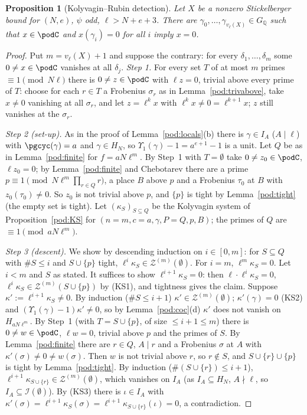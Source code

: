 \documentclass[10pt]{amsart}
\newtheorem{proposition}[theorem]{Proposition}
\theoremstyle{definition}
\theoremstyle{remark}
\newcommand{\Q}{\mathbb Q}
\begin{document}
\begin{proposition}[Kolyvagin--Rubin detection]\label{pod:koly}
Let $X$ be a nonzero Stickelberger bound for $(N,e)$, $\psi$ odd, $\ell>N+e+3$. There are
$\gamma_0,\dots,\gamma_{v_\ell(X)}\in G_\Q$ such that $x\in\podC$ and $x(\gamma_i)=0$ for all $i$ imply
$x=0$.
\end{proposition}
\begin{proof}
Put $m=v_\ell(X)+1$ and suppose the contrary: for every $\delta_1,\dots,\delta_m$ some $0\ne x\in\podC$
vanishes at all $\delta_j$. \emph{Step 1.} For every set $T$ of at most $m$ primes $\equiv1\pmod
{N\ell}$ there is $0\ne z\in\podC$ with $\ell z=0$, trivial above every prime of $T$: choose for each
$r\in T$ a Frobenius $\sigma_r$ as in Lemma~\ref{pod:trivabove}, take $x\ne0$ vanishing at all
$\sigma_r$, and let $z=\ell^kx$ with $\ell^kx\ne0=\ell^{k+1}x$; $z$ still vanishes at the $\sigma_r$.

\emph{Step 2 (set-up).} As in the proof of Lemma~\ref{pod:locals}(b) there is $\gamma\in I_A$
($A\mid\ell$) with $\pgcyc(\gamma)=a$ and $\gamma\in H_N$, so
$\Upsilon_1(\gamma)-1=a^{e+1}-1$ is a unit. Let $Q$ be as in Lemma~\ref{pod:finite} for
$f=aN\ell^m$. By Step~1 with $T=\emptyset$ take $0\ne z_0\in\podC$, $\ell z_0=0$; by
Lemma~\ref{pod:finite} and Chebotarev there are a prime $p\equiv1\pmod{N\ell^m\prod_{r\in Q}r}$, a place
$B$ above $p$ and a Frobenius $\tau_0$ at $B$ with $z_0(\tau_0)\ne0$. So $z_0$ is not trivial above
$p$, and $\{p\}$ is tight by Lemma~\ref{pod:tight} (the empty set is tight). Let $(\kappa_S)_{S
\subseteq Q}$ be the Kolyvagin system of Proposition~\ref{pod:KS} for $(n=m,c=a,\gamma,P=Q,p,B)$; the
primes of $Q$ are $\equiv1\pmod{aN\ell^m}$.

\emph{Step 3 (descent).} We show by descending induction on $i\in[0,m]$: for $S\subseteq Q$ with
$\#S\le i$ and $S\cup\{p\}$ tight, $\ell^i\kappa_S\in\mathcal Z^{(m)}(\emptyset)$. For $i=m$,
$\ell^m\kappa_S=0$. Let $i<m$ and $S$ as stated. It suffices to show $\ell^{i+1}\kappa_S=0$: then
$\ell\cdot\ell^i\kappa_S=0$, $\ell^i\kappa_S\in\mathcal Z^{(m)}(S\cup\{p\})$ by (KS1), and tightness
gives the claim. Suppose $\kappa':=\ell^{i+1}\kappa_S\ne0$. By induction ($\#S\le i+1$) $\kappa'\in
\mathcal Z^{(m)}(\emptyset)$; $\kappa'(\gamma)=0$ (KS2) and $(\Upsilon_1(\gamma)-1)\kappa'\ne0$, so by
Lemma~\ref{pod:coc}(d) $\kappa'$ does not vanish on $H_{aN\ell^m}$. By Step~1 (with $T=S\cup\{p\}$, of
size $\le i+1\le m$) there is $0\ne w\in\podC$, $\ell w=0$, trivial above $p$ and the primes of $S$. By
Lemma~\ref{pod:finite} there are $r\in Q$, $A\mid r$ and a Frobenius $\sigma$ at $A$ with
$\kappa'(\sigma)\ne0\ne w(\sigma)$. Then $w$ is not trivial above $r$, so $r\notin S$, and
$S\cup\{r\}\cup\{p\}$ is tight by Lemma~\ref{pod:tight}. By induction ($\#(S\cup\{r\})\le i+1$),
$\ell^{i+1}\kappa_{S\cup\{r\}}\in\mathcal Z^{(m)}(\emptyset)$, which vanishes on $I_A$ (as $I_A\subseteq
H_N$, $A\nmid\ell$, so $I_A\subseteq\mathcal I(\emptyset)$). By (KS3) there is $\iota\in I_A$ with
$\kappa'(\sigma)=\ell^{i+1}\kappa_S(\sigma)=\ell^{i+1}\kappa_{S\cup\{r\}}(\iota)=0$, a contradiction.


\end{proof}
\end{document}
